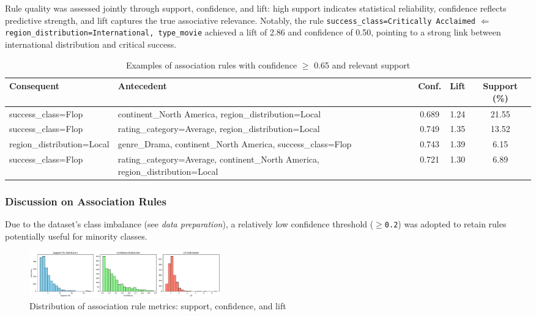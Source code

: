 \documentclass[10pt]{article}
\begin{document}
Rule quality was assessed jointly through support, confidence, and lift: high support indicates statistical reliability, confidence reflects predictive strength, and lift captures the true associative relevance. Notably, the rule \texttt{success\_class=Critically Acclaimed} $\Leftarrow$ \texttt{region\_distribution=International, type\_movie} achieved a lift of 2.86 and confidence of 0.50, pointing to a strong link between international distribution and critical success.


\begin{table}[H]
\centering
\label{tab:regole_flop}
\begin{tabular}{|p{4cm}|p{5.5cm}|c|c|c|}
\hline
\textbf{Consequent} & \textbf{Antecedent} & \textbf{Conf.} & \textbf{Lift} & \textbf{Support (\%)} \\
\hline
success\_class=Flop & continent\_North America, region\_distribution=Local & 0.689 & 1.24 & 21.55 \\
\hline

success\_class=Flop & rating\_category=Average, region\_distribution=Local & 0.749 & 1.35 & 13.52 \\
\hline

region\_distribution=Local & genre\_Drama, continent\_North America, success\_class=Flop & 0.743 & 1.39 & 6.15 \\
\hline
success\_class=Flop & rating\_category=Average, continent\_North America, region\_distribution=Local & 0.721 & 1.30 & 6.89 \\
\hline

\end{tabular}
    \caption{Examples of association rules with confidence $\geq$ 0.65 and relevant support}
\end{table}

\subsubsection{Discussion on Association Rules}

Due to the dataset’s class imbalance (see \emph{data preparation}), a relatively low confidence threshold (\texttt{$\geqslant$0.2}) was adopted to retain rules potentially useful for minority classes.

\begin{figure}[H]
\centering
\includegraphics[width=0.4\textwidth]{dist_sup_lift_conf.png}
\caption{Distribution of association rule metrics: support, confidence, and lift}
\label{fig:metriche_regole}
\end{figure}
\end{document}
